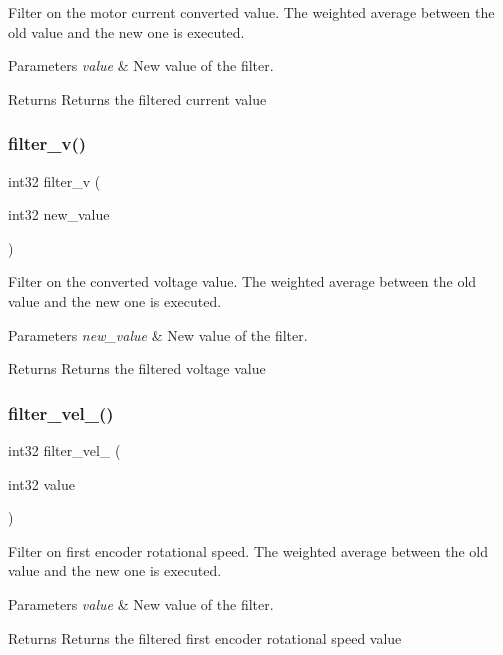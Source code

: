 Filter on the motor current converted value. The weighted average between the old value and the new one is executed.


\begin{DoxyParams}{Parameters}
{\em value} & New value of the filter.\\
\hline
\end{DoxyParams}
\begin{DoxyReturn}{Returns}
Returns the filtered current value 
\end{DoxyReturn}
\mbox{\label{utils_8h_af034fe9aa479d4adfc6e75e20b2f7ff3}} 
\subsubsection{filter\+\_\+v()}
{\footnotesize\ttfamily int32 filter\+\_\+v (\begin{DoxyParamCaption}\item[{int32}]{new\+\_\+value }\end{DoxyParamCaption})}

Filter on the converted voltage value. The weighted average between the old value and the new one is executed.


\begin{DoxyParams}{Parameters}
{\em new\+\_\+value} & New value of the filter.\\
\hline
\end{DoxyParams}
\begin{DoxyReturn}{Returns}
Returns the filtered voltage value 
\end{DoxyReturn}
\mbox{\label{utils_8h_ad378840ee71c2d41d2d4f1a84465c7f3}} 
\subsubsection{filter\+\_\+vel\+\_()}
{\footnotesize\ttfamily int32 filter\+\_\+vel\+\_ (\begin{DoxyParamCaption}\item[{int32}]{value }\end{DoxyParamCaption})}

Filter on first encoder rotational speed. The weighted average between the old value and the new one is executed.


\begin{DoxyParams}{Parameters}
{\em value} & New value of the filter.\\
\hline
\end{DoxyParams}
\begin{DoxyReturn}{Returns}
Returns the filtered first encoder rotational speed value 
\end{DoxyReturn}
\mbox{\label{utils_8h_abda54d76e676bb1cb27b5577bd0fe099}} 

